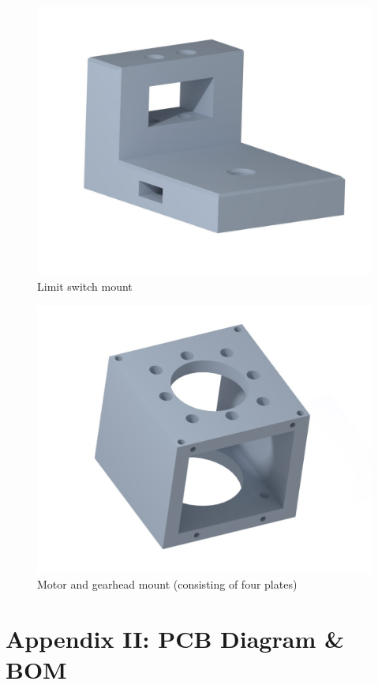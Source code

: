\documentclass[12pt]{report}
\begin{document}
	\begin{figure}[h] 
		\centering
		\includegraphics[width=\linewidth]{ls_mount2}
		\caption{Limit switch mount}
		\label{fig:ls_mount}
	\end{figure}

	\begin{figure}[h] 
		\centering
		\includegraphics[width=0.9\linewidth]{motor_mount01}
		\caption{Motor and gearhead mount (consisting of four plates)}
		\label{fig:motor_mount}
	\end{figure}

\chapter*{Appendix II: PCB Diagram \& BOM} \label{ap:pcb}
\end{document}
